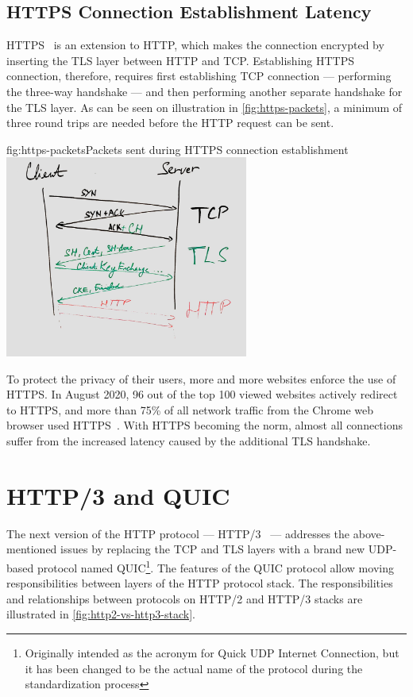 \subsection*{HTTPS Connection Establishment Latency}
HTTPS~\cite{rfc2818} is an extension to HTTP, which makes the connection encrypted by inserting the
TLS layer between HTTP and TCP\@. Establishing HTTPS connection, therefore, requires first
establishing TCP connection --- performing the three-way handshake --- and then performing another
separate handshake for the TLS layer. As can be seen on illustration in
\autoref{fig:https-packets}, a minimum of three round trips are needed before the HTTP request
can be sent.

\begin{myFigure}{fig:https-packets}{Packets sent during HTTPS connection establishment}
  \includegraphics[width=0.6\textwidth]{img/01-https-connection-packets}
\end{myFigure}

To protect the privacy of their users, more and more websites enforce the use of HTTPS\@.
In August 2020, 96 out of the top 100 viewed websites actively redirect to HTTPS, and more than 75\%
of all network traffic from the Chrome web browser used HTTPS~\cite{googleTransparency}. With HTTPS
becoming the norm, almost all connections suffer from the increased latency caused by the
additional TLS handshake.

\section{HTTP/3 and QUIC}

The next version of the HTTP protocol --- HTTP/3~\cite{draft-ietf-quic-http} --- addresses the
above-mentioned issues by replacing the TCP and TLS layers with a brand new UDP-based protocol named
QUIC\footnote{Originally intended as the acronym for Quick UDP Internet Connection, but it has been
changed to be the actual name of the protocol during the standardization process}. The features of
the QUIC protocol allow moving responsibilities between layers of the HTTP protocol stack. The
responsibilities and relationships between protocols on HTTP/2 and HTTP/3 stacks are illustrated in
\autoref{fig:http2-vs-http3-stack}.



